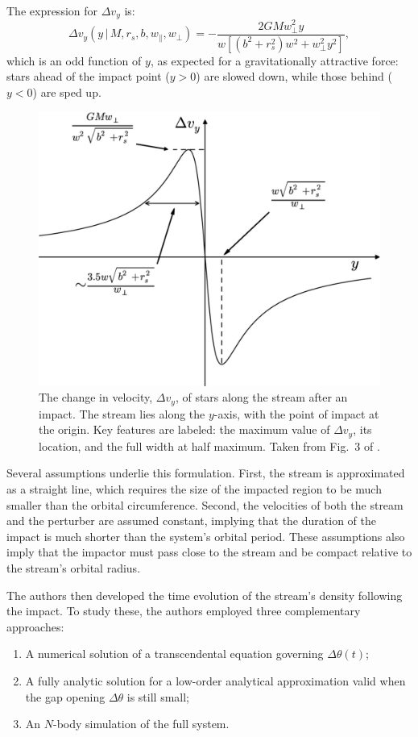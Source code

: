             The expression for $\Delta v_y$ is:
            \[
            \Delta v_y\left(y\,|\, M, r_s, b, w_\parallel, w_\perp\right) = - \frac{2GM w_\perp^2 y}{w\left[\left(b^2 + r_s^2\right)w^2 + w_\perp^2 y^2\right]},
            \]
            which is an odd function of $y$, as expected for a gravitationally attractive force: stars ahead of the impact point ($y>0$) are slowed down, while those behind ($y<0$) are sped up.
            \begin{figure}
                \centering
                \includegraphics[width=0.5\linewidth]{images/erkal_et_al_2015_fig_3.png}
                \caption{The change in velocity, $\Delta v_y$, of stars along the stream after an impact. The stream lies along the $y$-axis, with the point of impact at the origin. Key features are labeled: the maximum value of $\Delta v_y$, its location, and the full width at half maximum. Taken from Fig.~3 of \citet{2015MNRAS.450.1136E}.}
                \label{fig:erkal_2015_fig_3}
            \end{figure}

            Several assumptions underlie this formulation. First, the stream is approximated as a straight line, which requires the size of the impacted region to be much smaller than the orbital circumference. Second, the velocities of both the stream and the perturber are assumed constant, implying that the duration of the impact is much shorter than the system's orbital period. These assumptions also imply that the impactor must pass close to the stream and be compact relative to the stream's orbital radius.

            The authors then developed the time evolution of the stream's density following the impact. To study these, the authors employed three complementary approaches:
            \begin{enumerate}
                \item A numerical solution of a transcendental equation governing $\Delta \theta(t)$;
                \item A fully analytic solution for a low-order analytical approximation valid when the gap opening $\Delta \theta$ is still small;
                \item An $N$-body simulation of the full system.
            \end{enumerate}

